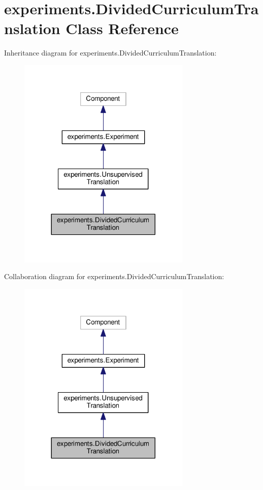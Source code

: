 \hypertarget{classexperiments_1_1DividedCurriculumTranslation}{}\section{experiments.\+Divided\+Curriculum\+Translation Class Reference}
\label{classexperiments_1_1DividedCurriculumTranslation}


Inheritance diagram for experiments.\+Divided\+Curriculum\+Translation\+:
\nopagebreak
\begin{figure}[H]
\begin{center}
\leavevmode
\includegraphics[width=233pt]{classexperiments_1_1DividedCurriculumTranslation__inherit__graph}
\end{center}
\end{figure}


Collaboration diagram for experiments.\+Divided\+Curriculum\+Translation\+:
\nopagebreak
\begin{figure}[H]
\begin{center}
\leavevmode
\includegraphics[width=233pt]{classexperiments_1_1DividedCurriculumTranslation__coll__graph}
\end{center}
\end{figure}
